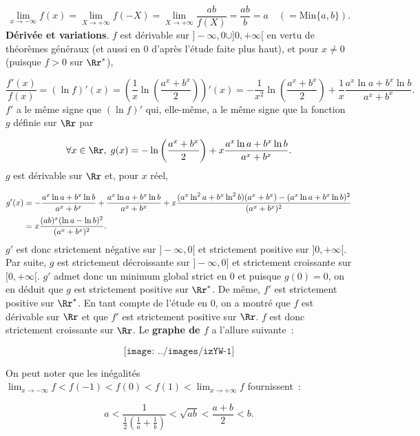 {{$$\lim_{x\rightarrow -\infty}f(x)=\lim_{X\rightarrow +\infty}f(-X)=\lim_{X\rightarrow +\infty}\frac{ab}{f(X)}=\frac{ab}{b}=a\quad(=\mbox{Min}\{a,b\}).$$
\textbf{Dérivée et variations}.
$f$ est dérivable sur $]-\infty,0\cup]0,+\infty[$ en vertu de théorèmes généraux (et aussi en $0$ d'après l'étude faite plus haut), et pour $x\neq0$ (puisque $f>0$ sur $\Rr^*$),

$$\frac{f'(x)}{f(x)}=(\ln f)'(x)=\left(\frac{1}{x}\ln\left(\frac{a^x+b^x}{2}\right)\right)'(x)=-\frac{1}{x^2}\ln\left(\frac{a^x+b^x}{2}\right)+\frac{1}{x}
\frac{a^x\ln a+b^x\ln b}{a^x+b^x}.$$
$f'$ a le même signe que $(\ln f)'$ qui, elle-même, a le même signe que la fonction $g$ définie sur $\Rr$ par

$$\forall x\in\Rr,\;g(x)=-\ln\left(\frac{a^x+b^x}{2}\right)+x\frac{a^x\ln a+b^x\ln b}{a^x+b^x}.$$
$g$ est dérivable sur $\Rr$ et, pour $x$ réel,

\begin{align*}\ensuremath
g'(x)&=-\frac{a^x\ln a+b^x\ln b}{a^x+b^x}+\frac{a^x\ln a+b^x\ln b}{a^x+b^x}+x\frac{(a^x\ln^2a+b^x\ln^2b)(a^x+b^x)-(a^x\ln a+b^x\ln b)^2}{(a^x+b^x)^2}\\
 &=x\frac{(ab)^x(\ln a-\ln b)^2}{(a^x+b^x)^2}.
\end{align*}
$g'$ est donc strictement négative sur $]-\infty,0[$ et strictement positive sur $]0,+\infty[$. Par suite, $g$ est strictement décroissante sur $]-\infty,0]$ et strictement croissante sur $[0,+\infty[$. $g'$ admet donc un minimum global strict en $0$ et puisque $g(0)=0$, on en déduit que $g$ est strictement positive sur $\Rr^*$. De même, $f'$ est strictement positive sur $\Rr^*$. En tant compte de l'étude en $0$, on a montré que $f$ est dérivable sur $\Rr$ et que $f'$ est strictement positive sur $\Rr$. $f$ est donc strictement croissante sur $\Rr$.
Le \textbf{graphe de $f$} a l'allure suivante~:

$$\texttt{[image: ../images/izYW-1]}$$

On peut noter que les inégalités $\lim_{x\rightarrow -\infty}f<f(-1)<f(0)<f(1)<\lim_{x\rightarrow +\infty}f$ fournissent~:

$$a<\frac{1}{\frac{1}{2}(\frac{1}{a}+\frac{1}{b})}<\sqrt{ab}<\frac{a+b}{2}<b.$$
}
}
